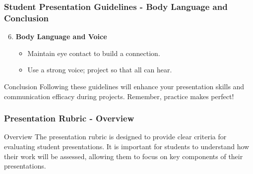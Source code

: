 \documentclass[aspectratio=169]{beamer}
\begin{document}
\begin{frame}[fragile]
    \frametitle{Student Presentation Guidelines - Body Language and Conclusion}
    \begin{enumerate}
        \setcounter{enumi}{5}
        \item \textbf{Body Language and Voice}
            \begin{itemize}
                \item Maintain eye contact to build a connection.
                \item Use a strong voice; project so that all can hear.
            \end{itemize}
    \end{enumerate}

    \begin{block}{Conclusion}
        Following these guidelines will enhance your presentation skills and communication efficacy during projects. Remember, practice makes perfect!
    \end{block}
\end{frame}

\begin{frame}[fragile]
    \frametitle{Presentation Rubric - Overview}
    \begin{block}{Overview}
        The presentation rubric is designed to provide clear criteria for evaluating student presentations. 
        It is important for students to understand how their work will be assessed, allowing them to focus on key components of their presentations.
    \end{block}
\end{frame}
\end{document}

